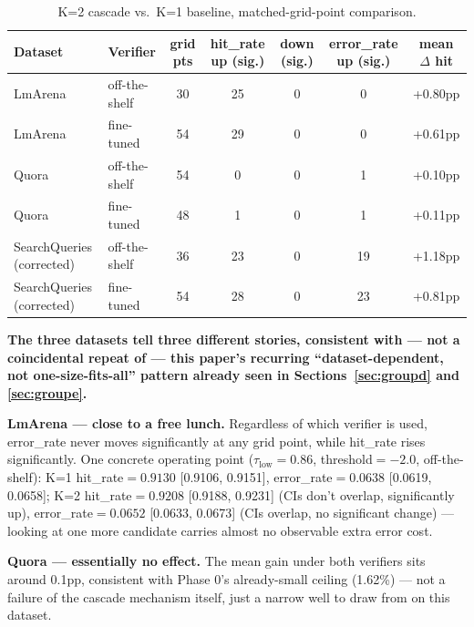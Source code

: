 \documentclass[11pt]{article}
\newcommand{\taulow}{\ensuremath{\tau_{\text{low}}}}
\newenvironment{fittab}{\begin{lrbox}{\fittabbox}}{\end{lrbox}%
  \ifdim\wd\fittabbox>\linewidth\resizebox{\linewidth}{!}{\usebox{\fittabbox}}\else\usebox{\fittabbox}\fi}
\begin{document}
\begin{table}[h]
\centering
\small
\begin{fittab}\begin{tabular}{llccccc}
\toprule
\textbf{Dataset} & \textbf{Verifier} & \textbf{grid pts} & \textbf{hit\_rate up (sig.)} & \textbf{down (sig.)} & \textbf{error\_rate up (sig.)} & \textbf{mean $\Delta$ hit} \\
\midrule
LmArena & off-the-shelf & 30 & 25 & 0 & 0 & +0.80pp \\
LmArena & fine-tuned & 54 & 29 & 0 & 0 & +0.61pp \\
Quora & off-the-shelf & 54 & 0 & 0 & 1 & +0.10pp \\
Quora & fine-tuned & 48 & 1 & 0 & 1 & +0.11pp \\
SearchQueries (corrected) & off-the-shelf & 36 & 23 & 0 & 19 & +1.18pp \\
SearchQueries (corrected) & fine-tuned & 54 & 28 & 0 & 23 & +0.81pp \\
\bottomrule
\end{tabular}\end{fittab}
\caption{K=2 cascade vs.\ K=1 baseline, matched-grid-point comparison.}
\end{table}

\textbf{The three datasets tell three different stories, consistent with --- not a coincidental repeat of --- this paper's recurring ``dataset-dependent, not one-size-fits-all'' pattern already seen in Sections~\ref{sec:groupd} and \ref{sec:groupe}.}

\textbf{LmArena --- close to a free lunch.} Regardless of which verifier is used, error\_rate never moves significantly at any grid point, while hit\_rate rises significantly. One concrete operating point ($\taulow=0.86$, threshold$=-2.0$, off-the-shelf): K=1 hit\_rate$=0.9130$ [0.9106, 0.9151], error\_rate$=0.0638$ [0.0619, 0.0658]; K=2 hit\_rate$=0.9208$ [0.9188, 0.9231] (CIs don't overlap, significantly up), error\_rate$=0.0652$ [0.0633, 0.0673] (CIs overlap, no significant change) --- looking at one more candidate carries almost no observable extra error cost.

\textbf{Quora --- essentially no effect.} The mean gain under both verifiers sits around 0.1pp, consistent with Phase 0's already-small ceiling (1.62\%) --- not a failure of the cascade mechanism itself, just a narrow well to draw from on this dataset.
\end{document}
